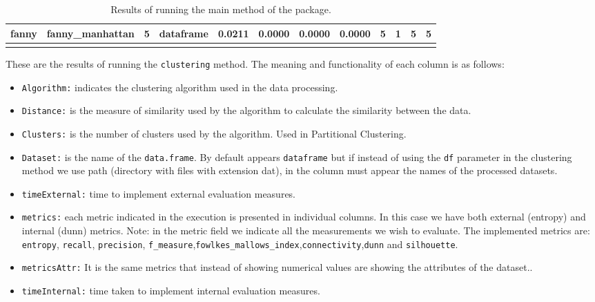 {\begin{longtable}{| p{1cm} | p{1.8cm} | p{0.7cm} | p{0.9cm} | p{0.5cm} | p{0.65cm} | p{0.5cm} | p{0.5cm} | p{0.55cm} | p{0.55cm} | p{0.6cm} | p{0.5cm} |}
\scriptsize   fanny   & \scriptsize  fanny\_manhattan & \scriptsize    5    & \scriptsize dataframe & \scriptsize    0.0211  &  \scriptsize 0.0000 & \scriptsize 0.0000 & \scriptsize    0.0000 & \scriptsize   5  & \scriptsize    1  & \scriptsize    5  & \scriptsize    5 \\
\hline
\caption{Results of running the main method of the package.}
\label{tab:clustering}
\end{longtable}}

These are the results of running the \texttt{clustering} method. The meaning and functionality of each column is as follows:
\begin{itemize}
  \item \texttt{Algorithm:} indicates the clustering algorithm used in the data processing.
  \item \texttt{Distance:} is the measure of similarity used by the algorithm to calculate the similarity between the data.
  \item \texttt{Clusters:} is the number of clusters used by the algorithm. Used in Partitional Clustering.
  \item \texttt{Dataset:} is the name of the \texttt{data.frame}. By default appears \texttt{dataframe} but if instead of using the \texttt{df} parameter in the clustering method we use path (directory with files with extension dat), in the column must appear the names of the processed datasets.
  \item \texttt{timeExternal:} time to implement external evaluation measures.
  \item \texttt{metrics:} each metric indicated in the execution is presented in individual columns. In this case we have both external (entropy) and internal (dunn) metrics.
  Note: in the metric field we indicate all the measurements we wish to evaluate. The implemented metrics are: \texttt{entropy}, \texttt{recall}, \texttt{precision}, \texttt{f\_measure},\texttt{fowlkes\_mallows\_index},\texttt{connectivity},\texttt{dunn} and \texttt{silhouette}.
  \item \texttt{metricsAttr:} It is the same metrics that instead of showing numerical values are showing the attributes of the dataset..
  \item \texttt{timeInternal:} time taken to implement internal evaluation measures.\\
\end{itemize}

